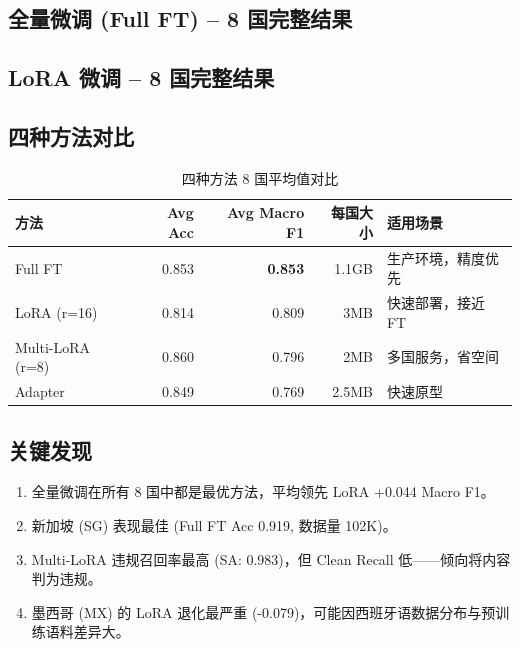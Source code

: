 \documentclass[11pt,a4paper]{article}
\begin{document}
\subsection{全量微调 (Full FT) -- 8 国完整结果}



\subsection{LoRA 微调 -- 8 国完整结果}



\subsection{四种方法对比}

\begin{table}[h]\centering
\caption{四种方法 8 国平均值对比}\label{tab:method-compare}
\begin{tabular}{@{}lrrrl@{}}\toprule
\textbf{方法} & \textbf{Avg Acc} & \textbf{Avg Macro F1} & \textbf{每国大小} & \textbf{适用场景} \\\midrule
Full FT & 0.853 & \textbf{0.853} & 1.1GB & 生产环境，精度优先 \\
LoRA (r=16) & 0.814 & 0.809 & 3MB & 快速部署，接近 FT \\
Multi-LoRA (r=8) & 0.860 & 0.796 & 2MB & 多国服务，省空间 \\
Adapter & 0.849 & 0.769 & 2.5MB & 快速原型 \\
\bottomrule
\end{tabular}
\end{table}

\subsection{关键发现}

\begin{enumerate}[itemsep=2pt]
\item 全量微调在所有 8 国中都是最优方法，平均领先 LoRA +0.044 Macro F1。
\item 新加坡 (SG) 表现最佳 (Full FT Acc 0.919, 数据量 102K)。
\item Multi-LoRA 违规召回率最高 (SA: 0.983)，但 Clean Recall 低——倾向将内容判为违规。
\item 墨西哥 (MX) 的 LoRA 退化最严重 (-0.079)，可能因西班牙语数据分布与预训练语料差异大。
\end{enumerate}
\end{document}
